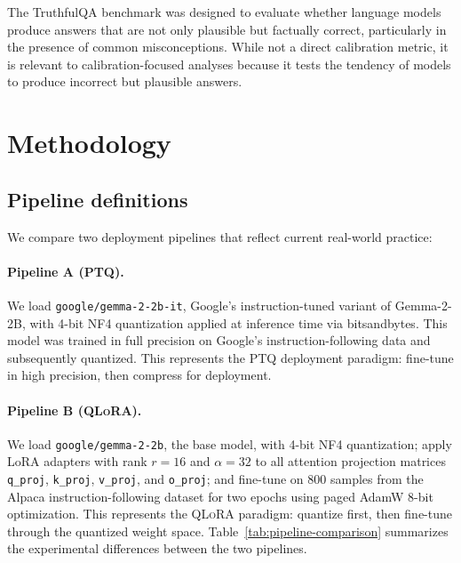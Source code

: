 \documentclass[10pt]{article}
\newcommand{\ptq}{\textsc{PTQ}}
\newcommand{\qlora}{\textsc{QLoRA}}
\begin{document}
The TruthfulQA benchmark \citep{lin2022truthfulqa} was designed to evaluate whether language models produce answers that are not only plausible but factually correct, particularly in the presence of common misconceptions. While not a direct calibration metric, it is relevant to calibration-focused analyses because it tests the tendency of models to produce incorrect but plausible answers.

\section{Methodology}

\subsection{Pipeline definitions}

We compare two deployment pipelines that reflect current real-world practice:

\paragraph{Pipeline A (\ptq).}
We load \texttt{google/gemma-2-2b-it}, Google's instruction-tuned variant of Gemma-2-2B, with 4-bit NF4 quantization applied at inference time via bitsandbytes. This model was trained in full precision on Google's instruction-following data and subsequently quantized. This represents the \ptq{} deployment paradigm: fine-tune in high precision, then compress for deployment.

\paragraph{Pipeline B (\qlora).}
We load \texttt{google/gemma-2-2b}, the base model, with 4-bit NF4 quantization; apply LoRA adapters with rank $r=16$ and $\alpha=32$ to all attention projection matrices \texttt{q\_proj}, \texttt{k\_proj}, \texttt{v\_proj}, and \texttt{o\_proj}; and fine-tune on 800 samples from the Alpaca instruction-following dataset \citep{taori2023alpaca} for two epochs using paged AdamW 8-bit optimization. This represents the \qlora{} paradigm: quantize first, then fine-tune through the quantized weight space. Table~\ref{tab:pipeline-comparison} summarizes the experimental differences between the two pipelines.
\end{document}
